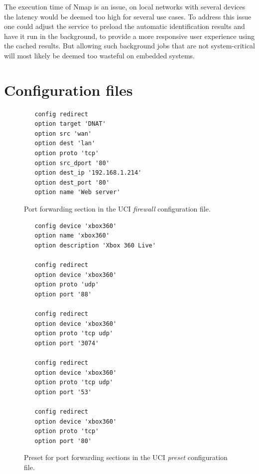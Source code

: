 \documentclass[a4paper,11pt,makeidx]{kth-bcs}
\begin{document}
The execution time of Nmap is an issue, on local networks with several devices the latency would be deemed too high for several use cases.
To address this issue one could adjust the service to preload the automatic identification results and have it run in the background, to provide a more responsive user experience using the cached results.
But allowing such background jobs that are not system-critical will most likely be deemed too wasteful on embedded systems.

\newpage
\newpage
\appendix
\addappheadtotoc
\chapter{Configuration files}\label{appA}

\begin{figure}[ht]
   \centering
   \begin{lstlisting}
   config redirect               
   option target 'DNAT' 
   option src 'wan'
   option dest 'lan'
   option proto 'tcp'
   option src_dport '80'
   option dest_ip '192.168.1.214'
   option dest_port '80' 
   option name 'Web server'
   \end{lstlisting}
   \caption{
      \small{
         Port forwarding section in the UCI \emph{firewall} configuration file.
      }
   }
   \label{fig:redirect_conf}
\end{figure}

\begin{figure}[ht]
   \centering
   \begin{lstlisting}
   config device 'xbox360'
   option name 'xbox360'
   option description 'Xbox 360 Live'

   config redirect
   option device 'xbox360'
   option proto 'udp'
   option port '88'

   config redirect
   option device 'xbox360'
   option proto 'tcp udp'
   option port '3074'

   config redirect
   option device 'xbox360'
   option proto 'tcp udp'
   option port '53'

   config redirect
   option device 'xbox360'
   option proto 'tcp'
   option port '80'
   \end{lstlisting}
   \caption{
      \small{
         Preset for port forwarding sections in the UCI \emph{preset} configuration file.
      }
   }
   \label{fig:preset_conf}
\end{figure}
\end{document}
